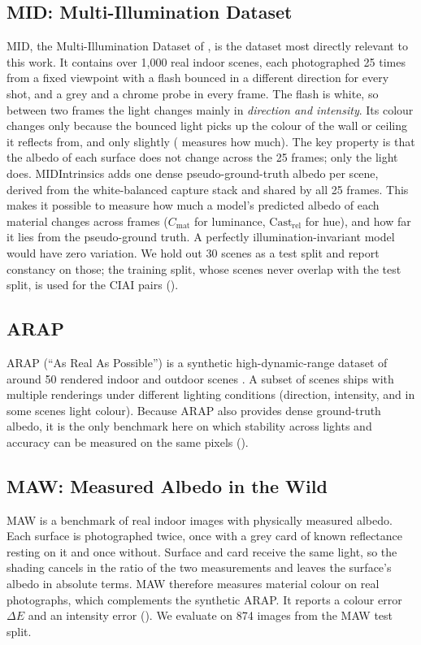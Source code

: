 \subsection{MID: Multi-Illumination Dataset}
\label{sec:mid_dataset}

MID, the Multi-Illumination Dataset of , is the dataset
most directly relevant to this work.
It contains over 1{,}000 real indoor scenes, each photographed 25 times from a
fixed viewpoint with a flash bounced in a different direction for every shot, and
a grey and a chrome probe in every frame.
The flash is white, so between two frames the light changes mainly in
\emph{direction and intensity}. Its colour changes only because the bounced light picks up
the colour of the wall or ceiling it reflects from, and only slightly
( measures how much).
The key property is that the albedo of each surface does not change across the 25
frames; only the light does. MIDIntrinsics  adds one dense
pseudo-ground-truth albedo per scene, derived from the white-balanced capture stack and
shared by all 25 frames. This makes it possible to measure how much a model's predicted
albedo of each material changes across frames ($C_{\text{mat}}$ for luminance,
$\text{Cast}_{\text{rel}}$ for hue), and how far it lies from the pseudo-ground truth.
A perfectly illumination-invariant model would have zero variation.
We hold out 30 scenes as a test split and report constancy on those; the training
split, whose scenes never overlap with the test split, is used for the CIAI pairs
().

\subsection{ARAP}
\label{sec:arap_dataset}

ARAP (``As Real As Possible'') is a synthetic high-dynamic-range dataset of
around 50 rendered indoor and outdoor scenes .
A subset of scenes ships with multiple renderings under different lighting
conditions (direction, intensity, and in some scenes light colour). Because ARAP
also provides dense ground-truth albedo, it is the only benchmark here on which
stability across lights and accuracy can be measured on the same pixels
().

\subsection{MAW: Measured Albedo in the Wild}
\label{sec:maw_dataset}

MAW  is a benchmark of real indoor images with physically measured albedo.
Each surface is photographed twice, once with a grey card of known reflectance resting on it
and once without. Surface and card receive the same light, so the shading cancels in the
ratio of the two measurements and leaves the surface's albedo in absolute terms. MAW
therefore measures material colour on real photographs, which complements the synthetic
ARAP. It reports a colour error $\Delta E$ and an intensity error ().
We evaluate on 874 images from the MAW test split.
